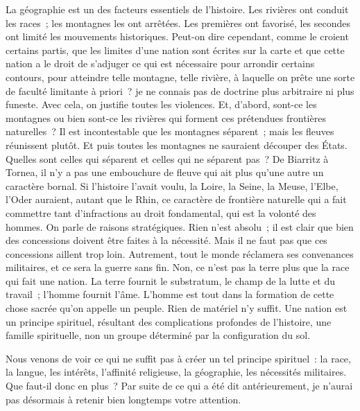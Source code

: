 \documentclass[twoside]{book} %
\newcommand\placeName[1]{#1}
\newcommand\chapteropen{} %
\newcommand\chapterclose{} %
\begin{document}
\noindent La géographie est un des facteurs essentiels de l’histoire. Les rivières ont conduit les races ; les montagnes les ont arrêtées. Les premières ont favorisé, les secondes ont limité les mouvements historiques. Peut-on dire cependant, comme le croient certains partis, que les limites d’une nation sont écrites sur la carte et que cette nation a le droit de s’adjuger ce qui est nécessaire pour arrondir certains contours, pour atteindre telle montagne, telle rivière, à laquelle on prête une sorte de faculté limitante à priori ? je ne connais pas de doctrine plus arbitraire ni plus funeste. Avec cela, on justifie toutes les violences. Et, d’abord, sont-ce les montagnes ou bien sont-ce les rivières qui forment ces prétendues frontières naturelles ? Il est incontestable que les montagnes séparent ; mais les fleuves réunissent plutôt. Et puis toutes les montagnes ne sauraient découper des États. Quelles sont celles qui séparent et celles qui ne séparent pas ? De {\placeName Biarritz} à {\placeName Tornea}, il n’y a pas une embouchure de fleuve qui ait plus qu’une autre un caractère bornal. Si l’histoire l’avait voulu, la {\placeName Loire}, la {\placeName Seine}, la {\placeName Meuse}, l’{\placeName Elbe}, l’{\placeName Oder} auraient, autant que le {\placeName Rhin}, ce caractère de frontière naturelle qui a fait commettre tant d’infractions au droit fondamental, qui est la volonté des hommes. On parle de raisons stratégiques. Rien n’est absolu ; il est clair que bien des concessions doivent être faites à la nécessité. Mais il ne faut pas que ces concessions aillent trop loin. Autrement, tout le monde réclamera ses convenances militaires, et ce sera la guerre sans fin. Non, ce n’est pas la terre plus que la race qui fait une nation. La terre fournit le substratum, le champ de la lutte et du travail ; l’homme fournit l’âme. L’homme est tout dans la formation de cette chose sacrée qu’on appelle un peuple. Rien de matériel n’y suffit. Une nation est un principe spirituel, résultant des complications profondes de l’histoire, une famille spirituelle, non un groupe déterminé par la configuration du sol.\par
Nous venons de voir ce qui ne suffit pas à créer un tel principe spirituel : la race, la langue, les intérêts, l’affinité religieuse, la géographie, les nécessités militaires. Que faut-il donc en plus ? Par suite de ce qui a été dit antérieurement, je n’aurai pas désormais à retenir bien longtemps votre attention.
\chapterclose


\chapteropen
\end{document}
